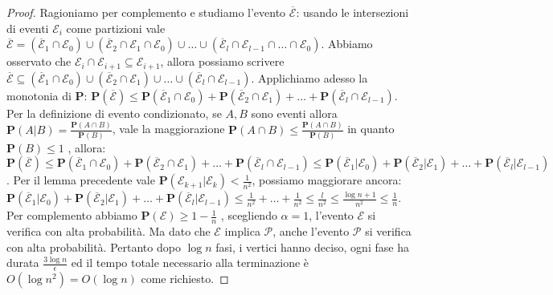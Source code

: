 \documentclass{article}
\begin{document}
\begin{proof}
    Ragioniamo per 
    complemento e studiamo l'evento $\overline{\mathcal{E}}$: usando 
    le intersezioni di eventi $\mathcal{E}_i$ come partizioni
    vale $\overline{\mathcal{E}} = (\overline{\mathcal{E}}_1
    \cap \mathcal{E}_0) \cup (\overline{\mathcal{E}}_2
    \cap \mathcal{E}_1 \cap \mathcal{E}_0) \cup \ldots \cup 
    (\overline{\mathcal{E}}_l \cap \mathcal{E}_{l-1} \cap \ldots
    \cap \mathcal{E}_0)$. Abbiamo osservato che $\mathcal{E}_i \cap 
    \mathcal{E}_{i+1} \subseteq \mathcal{E}_{i+1}$, allora possiamo scrivere 
    $\overline{\mathcal{E}} \subseteq
    (\overline{\mathcal{E}}_1
    \cap \mathcal{E}_0) \cup (\overline{\mathcal{E}}_2
    \cap \mathcal{E}_1 ) \cup \ldots \cup 
    (\overline{\mathcal{E}}_l \cap \mathcal{E}_{l-1})$. Applichiamo adesso 
    la monotonia di $\mathbf{P}$: $\mathbf{P}(\overline{\mathcal{E}}) \leq
    \mathbf{P}(\overline{\mathcal{E}}_1
    \cap \mathcal{E}_0) + \mathbf{P}(\overline{\mathcal{E}}_2
    \cap \mathcal{E}_1 ) + \ldots + 
    \mathbf{P}(\overline{\mathcal{E}}_l \cap \mathcal{E}_{l-1})$. Per la 
    definizione di evento condizionato, se $A,B$ sono eventi allora $
    \mathbf{P}(A|B) = \frac{\mathbf{P}(A\cap B)}{\mathbf{P}(B)}$, vale 
    la maggiorazione ${\mathbf{P}(A\cap B)} \leq 
    \frac{\mathbf{P}(A\cap B)}{\mathbf{P}(B)}$ in quanto $\mathbf{P}(B) \leq 1$
    , allora: 
    $\mathbf{P}(\overline{\mathcal{E}}) \leq
    \mathbf{P}(\overline{\mathcal{E}}_1
    \cap \mathcal{E}_0) + \mathbf{P}(\overline{\mathcal{E}}_2
    \cap \mathcal{E}_1 ) + \ldots + 
    \mathbf{P}(\overline{\mathcal{E}}_l \cap \mathcal{E}_{l-1}) \leq
    \mathbf{P}(\overline{\mathcal{E}}_1
    | \mathcal{E}_0) + \mathbf{P}(\overline{\mathcal{E}}_2
    | \mathcal{E}_1 ) + \ldots + 
    \mathbf{P}(\overline{\mathcal{E}}_l | \mathcal{E}_{l-1})$. Per il 
    lemma precedente vale $\mathbf{P}(\mathcal{E}_{k+1}|
    \mathcal{E}_{k}) < \frac{1}{n^2}$, possiamo maggiorare ancora:
    $\mathbf{P}(\overline{\mathcal{E}}_1
    | \mathcal{E}_0) + \mathbf{P}(\overline{\mathcal{E}}_2
    | \mathcal{E}_1 ) + \ldots + 
    \mathbf{P}(\overline{\mathcal{E}}_l | \mathcal{E}_{l-1}) \leq 
    \frac{1}{n^2} + \ldots + \frac{1}{n^2} \leq \frac{l}{n^2} \leq 
    \frac{\log{n} + 1}{n^2} \leq \frac{1}{n}$. Per complemento abbiamo 
    $\mathbf{P}(\mathcal{E}) \geq 1 - \frac{1}{n}$ , scegliendo $\alpha
    = 1$, l'evento $\mathcal{E}$ si verifica con alta probabilit\`a. Ma
    dato che $\mathcal{E}$ implica $\mathcal{P}$, anche l'evento $
    \mathcal{P}$ si verifica con alta probabilit\`a. Pertanto dopo $\log{n}$
    fasi, i vertici hanno deciso, ogni fase ha durata $\frac{3\log{n}}{\epsilon}$
    ed il tempo totale necessario alla terminazione \`e $O(\log{n}^2) = 
    O(\log{n})$ come richiesto.
\end{proof}
\end{document}
